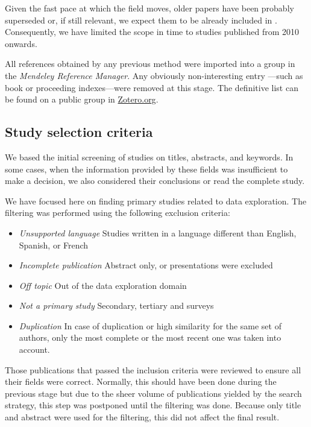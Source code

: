 Given the fast pace at which the field moves, older papers have been probably
superseded or, if still relevant, we expect them to be already included in \cite{Idreos2015}.
Consequently, we have limited the scope in time to studies published from 2010 onwards.

All references obtained by any previous method were imported into
a group in the \emph{Mendeley Reference Manager}. Any obviously non-interesting entry
---such as book or proceeding indexes---were removed at this stage.
The definitive list can be found on a public group in
\href{https://www.zotero.org/groups/4517638/ide-in-science/library}{Zotero.org}\footnotemark.


\subsection{Study selection criteria}
We based the initial screening of studies on titles, abstracts, and keywords.
In some cases, when the information provided by these fields was
insufficient to make a decision, we also considered their conclusions
or read the complete study.

We have focused here on finding primary studies related to data exploration.
The filtering was performed using the following exclusion criteria:

\begin{itemize}
  \item \emph{Unsupported language} Studies written in a language different than
  English, Spanish, or French
  \item \emph{Incomplete publication} Abstract only, or presentations were excluded
  \item \emph{Off topic} Out of the data exploration domain
  \item \emph{Not a primary study} Secondary, tertiary and surveys
  \item \emph{Duplication} In case of duplication or high similarity for the same
  set of authors, only the most complete or the most recent one was
  taken into account.
\end{itemize}

Those publications that passed the inclusion criteria were reviewed to ensure all their fields were correct. Normally, this should have been done during
the previous stage but due to the sheer volume of publications yielded by the
search strategy, this step was postponed until the filtering was done. Because only
title and abstract were used for the filtering, this did not affect the final
result.

